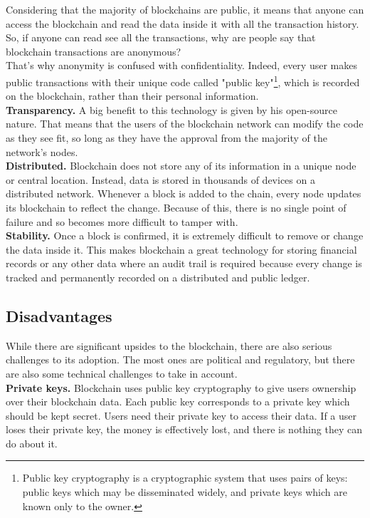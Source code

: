 Considering that the majority of blockchains are public, it means that anyone 
can access the blockchain and read the data inside it with all the transaction 
history. So, if anyone can read see all the transactions, why are people say that
blockchain transactions are anonymous?\\
That’s why anonymity is confused with confidentiality. Indeed, every user makes 
public transactions with their unique code called "public key"\footnote{Public key cryptography is a cryptographic system that uses pairs of keys: public keys which may be disseminated widely, and private keys which are known only to the owner.},
which is recorded on the blockchain, rather than their personal information.\cite{investopedia}\pagebreak
\bigskip\\
\textbf{Transparency.}
A big benefit to this technology is given by his open-source nature. That means
that the users of the blockchain network can modify the code as they see fit, so long
as they have the approval from the majority of the network's nodes.
\bigskip\\
\textbf{Distributed.}
Blockchain does not store any of its information in a unique node or central 
location. Instead, data is stored in thousands of devices on a distributed
network. Whenever a block is added to the chain, every node updates its blockchain
to reflect the change. Because of this, there is no single point of failure
and so becomes more difficult to tamper with.\cite{binancevision}\cite{investopedia}
\bigskip\\
\textbf{Stability.}
Once a block is confirmed, it is extremely difficult to remove or change the data inside it.
This makes blockchain a great technology for storing financial records or any other data 
where an audit trail is required because every change is tracked and permanently recorded 
on a distributed and public ledger.\cite{binancevision}
\bigskip

\subsection{Disadvantages}
\label{sec:disadvantages}

While there are significant upsides to the blockchain, there are also serious 
challenges to its adoption. The most ones are political and regulatory, but 
there are also some technical challenges to take in account.
\bigskip\\
\textbf{Private keys.} 
Blockchain uses public key cryptography to give users ownership over their blockchain data.
Each public key corresponds to a private key which should be kept secret. Users need their 
private key to access their data. If a user loses their private key, the money is 
effectively lost, and there is nothing they can do about it.\cite{binancevision}\\

